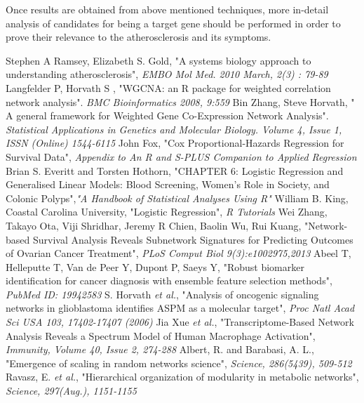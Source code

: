 \documentclass{ba-kecs}
\numberwithin{figure}{section}
\numberwithin{equation}{section}
\begin{document}
Once results are obtained from above mentioned techniques, more in-detail analysis of candidates for being a target gene should be performed in order to prove their relevance to the atherosclerosis and its symptoms.




\begin{thebibliography}{99}
 Stephen A Ramsey, Elizabeth S. Gold, "A systems biology approach to understanding atherosclerosis", \emph{EMBO Mol Med. 2010 March, 2(3) : 79-89}
 Langfelder P, Horvath S , "WGCNA: an R package for weighted correlation network analysis". \emph{BMC Bioinformatics 2008, 9:559}
 Bin Zhang, Steve Horvath, " A general framework for Weighted Gene Co-Expression Network Analysis". \emph{Statistical Applications in Genetics and Molecular Biology. Volume 4, Issue 1, ISSN (Online) 1544-6115}
 John Fox, "Cox Proportional-Hazards Regression for Survival Data", \emph{Appendix to An R and S-PLUS Companion to Applied Regression}
 Brian S. Everitt and Torsten Hothorn, "CHAPTER 6: Logistic Regression and Generalised Linear Models: Blood Screening, Women’s Role in Society, and Colonic Polyps",\emph{"A Handbook of Statistical Analyses Using R"}
 William B. King, Coastal Carolina University, "Logistic Regression", \emph{R Tutorials} 
 Wei Zhang, Takayo Ota, Viji Shridhar, Jeremy R Chien, Baolin Wu, Rui Kuang, "Network-based Survival Analysis Reveals Subnetwork Signatures for Predicting Outcomes of Ovarian Cancer Treatment", \emph{PLoS Comput Biol 9(3):e1002975,2013}
 Abeel T, Helleputte T, Van de Peer Y, Dupont P, Saeys Y, "Robust biomarker identification for cancer diagnosis with ensemble feature selection methods", \emph{PubMed ID: 19942583}
 S. Horvath \emph{et al.}, "Analysis of oncogenic signaling networks in glioblastoma identifies ASPM as a molecular target", \emph{Proc Natl Acad Sci USA 103, 17402-17407 (2006)}
 Jia Xue \emph{et al.}, "Transcriptome-Based Network Analysis Reveals a Spectrum Model of Human Macrophage Activation", \emph{Immunity, Volume 40, Issue 2, 274-288}
 Albert, R. and Barabasi, A. L., "Emergence of scaling in random networks science", \emph{Science, 286(5439), 509-512}
 Ravasz, E. \emph{et al.}, "Hierarchical organization of modularity in metabolic networks", \emph{Science, 297(Aug.), 1151-1155}

\end{thebibliography}
\end{document}
